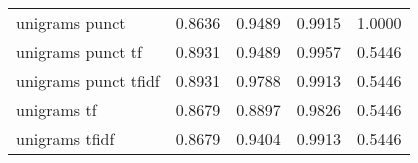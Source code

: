 \documentclass{article}
\begin{document}
\begin{table}
\begin{tabular}{lrrrr}
unigrams punct             & 0.8636 &       0.9489 &         0.9915 &               1.0000 \\
unigrams punct tf          & 0.8931 &       0.9489 &         0.9957 &               0.5446 \\
unigrams punct tfidf       & 0.8931 &       0.9788 &         0.9913 &               0.5446 \\
unigrams tf                & 0.8679 &       0.8897 &         0.9826 &               0.5446 \\
unigrams tfidf             & 0.8679 &       0.9404 &         0.9913 &               0.5446 \\
\bottomrule
\end{tabular}


\end{table}
\end{document}
